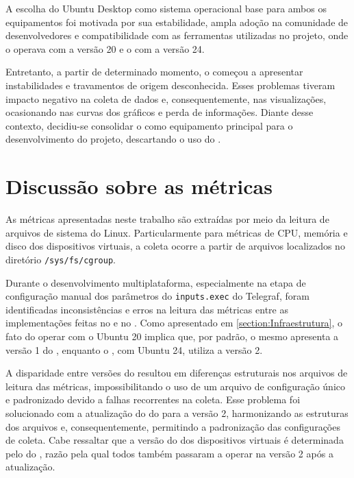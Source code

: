 A escolha do Ubuntu Desktop como sistema operacional base para ambos os equipamentos foi motivada por sua estabilidade, ampla adoção na comunidade de desenvolvedores e compatibilidade com as ferramentas utilizadas no projeto, onde o  operava com a versão 20 e o  com a versão 24.

Entretanto, a partir de determinado momento, o  começou a apresentar instabilidades e travamentos de origem desconhecida. Esses problemas tiveram impacto negativo na coleta de dados e, consequentemente, nas visualizações, ocasionando  nas curvas dos gráficos e perda de informações. Diante desse contexto, decidiu-se consolidar o  como equipamento principal para o desenvolvimento do projeto, descartando o uso do .



\section{Discussão sobre as métricas}
\label{section:DiscussaoMetricas}

As métricas apresentadas neste trabalho são extraídas por meio da leitura de arquivos de sistema do Linux. Particularmente para métricas de CPU, memória e disco dos dispositivos virtuais, a coleta ocorre a partir de arquivos localizados no diretório \verb|/sys/fs/cgroup|.

Durante o desenvolvimento multiplataforma, especialmente na etapa de configuração manual dos parâmetros do \verb|inputs.exec| do Telegraf, foram identificadas inconsistências e erros na leitura das métricas entre as implementações feitas no  e no . Como apresentado em \ref{section:Infraestrutura}, o fato do  operar com o Ubuntu 20 implica que, por padrão, o mesmo apresenta a versão 1 do , enquanto o , com Ubuntu 24, utiliza a versão 2.

A disparidade entre versões do  resultou em diferenças estruturais nos arquivos de leitura das métricas, impossibilitando o uso de um arquivo de configuração único e padronizado devido a falhas recorrentes na coleta. Esse problema foi solucionado com a atualização do  do  para a versão 2, harmonizando as estruturas dos arquivos e, consequentemente, permitindo a padronização das configurações de coleta. Cabe ressaltar que a versão do  dos dispositivos virtuais é determinada pelo  do , razão pela qual todos também passaram a operar na versão 2 após a atualização.

